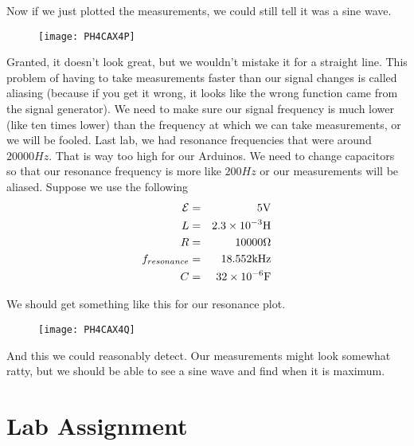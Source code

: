 Now if we just plotted the measurements, we could still tell it was a sine
wave.\begin{figure}[h!]
\texttt{[image: PH4CAX4P]}
\end{figure}Granted, it doesn't look great,
but we wouldn't mistake it for a straight line. This problem of having to
take measurements faster than our signal changes is called aliasing (because
if you get it wrong, it looks like the wrong function came from the signal
generator). We need to make sure our signal frequency is much lower (like
ten times lower) than the frequency at which we can take measurements, or we
will be fooled. Last lab, we had resonance frequencies that were around $%
20000\unit{Hz}.$ That is way too high for our Arduinos. We need to change
capacitors so that our resonance frequency is more like $200\unit{Hz}$ or
our measurements will be aliased. Suppose we use the following 
\begin{eqnarray*}
\mathcal{E} &=&5\unit{V} \\
L &=&2.3\times 10^{-3}\unit{H} \\
R &=&10000\unit{%
\Omega%
} \\
f_{resonance} &=&18.552\unit{kHz} \\
C &=&32\times 10^{-6}\unit{F}
\end{eqnarray*}

We should get something like this for our resonance plot.

\begin{figure}[h!]
\texttt{[image: PH4CAX4Q]}
\end{figure}And this we could reasonably
detect. Our measurements might look somewhat ratty, but we should be able to
see a sine wave and find when it is maximum.

\section{Lab Assignment}

